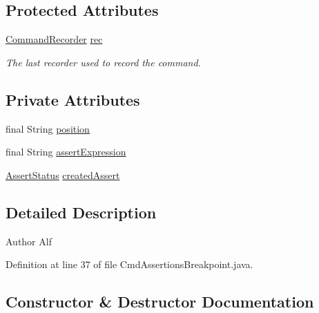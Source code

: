 \subsection*{Protected Attributes}
\begin{DoxyCompactItemize}
\item 
\hyperlink{classgov_1_1nasa_1_1jpf_1_1inspector_1_1client_1_1_command_recorder}{Command\+Recorder} \hyperlink{classgov_1_1nasa_1_1jpf_1_1inspector_1_1client_1_1_client_command_af4246f2427035c72a6af45a2c61361f7}{rec}
\begin{DoxyCompactList}\small\item\em The last recorder used to record the command. \end{DoxyCompactList}\end{DoxyCompactItemize}
\subsection*{Private Attributes}
\begin{DoxyCompactItemize}
\item 
final String \hyperlink{classgov_1_1nasa_1_1jpf_1_1inspector_1_1client_1_1commands_1_1_cmd_assertions_breakpoint_a058ca4f053ad9225b170a5004e970f6d}{position}
\item 
final String \hyperlink{classgov_1_1nasa_1_1jpf_1_1inspector_1_1client_1_1commands_1_1_cmd_assertions_breakpoint_a895cf2fd0928238c1a8d0e6349b40b91}{assert\+Expression}
\item 
\hyperlink{interfacegov_1_1nasa_1_1jpf_1_1inspector_1_1interfaces_1_1_assert_status}{Assert\+Status} \hyperlink{classgov_1_1nasa_1_1jpf_1_1inspector_1_1client_1_1commands_1_1_cmd_assertions_breakpoint_ad1982dcd049bd771eccd31379176ba04}{created\+Assert}
\end{DoxyCompactItemize}


\subsection{Detailed Description}
\begin{DoxyAuthor}{Author}
Alf 
\end{DoxyAuthor}


Definition at line 37 of file Cmd\+Assertions\+Breakpoint.\+java.



\subsection{Constructor \& Destructor Documentation}
